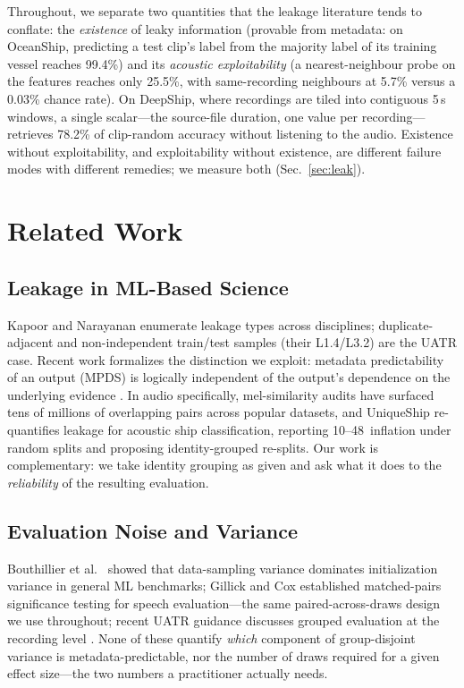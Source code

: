 ﻿\documentclass[journal]{IEEEtran}
\newcommand{\pp}{\,\text{pp}}
\begin{document}
Throughout, we separate two quantities that the leakage literature tends to conflate: the
\emph{existence} of leaky information (provable from metadata: on OceanShip, predicting a test
clip's label from the majority label of its training vessel reaches 99.4\%) and its
\emph{acoustic exploitability} (a nearest-neighbour probe on the features reaches only 25.5\%, with
same-recording neighbours at 5.7\% versus a 0.03\% chance rate). On DeepShip, where recordings are
tiled into contiguous 5\,s windows, a single scalar---the source-file duration, one value per
recording---retrieves 78.2\% of clip-random accuracy without listening to the audio. Existence
without exploitability, and exploitability without existence, are different failure modes with
different remedies; we measure both (Sec.~\ref{sec:leak}).

\section{Related Work}
\subsection{Leakage in ML-Based Science}
Kapoor and Narayanan \cite{kapoor2023} enumerate leakage types across disciplines; duplicate-adjacent
and non-independent train/test samples (their L1.4/L3.2) are the UATR case. Recent work formalizes
the distinction we exploit: metadata predictability of an output (MPDS) is logically independent of
the output's dependence on the underlying evidence \cite{mpds2026}. In audio specifically,
mel-similarity audits have surfaced tens of millions of overlapping pairs across popular datasets,
and UniqueShip \cite{uniqueship2026} re-quantifies leakage for acoustic ship classification,
reporting 10--48\pp{} inflation under random splits and proposing identity-grouped re-splits. Our
work is complementary: we take identity grouping as given and ask what it does to the
\emph{reliability} of the resulting evaluation.

\subsection{Evaluation Noise and Variance}
Bouthillier et al.\ \cite{bouthillier2021} showed that data-sampling variance dominates
initialization variance in general ML benchmarks; Gillick and Cox \cite{gillick1989} established
matched-pairs significance testing for speech evaluation---the same paired-across-draws design we
use throughout; recent UATR guidance discusses grouped evaluation at the recording level
\cite{review2026}.
None of these quantify
\emph{which} component of group-disjoint variance is metadata-predictable, nor the number of draws
required for a given effect size---the two numbers a practitioner actually needs.
\end{document}
